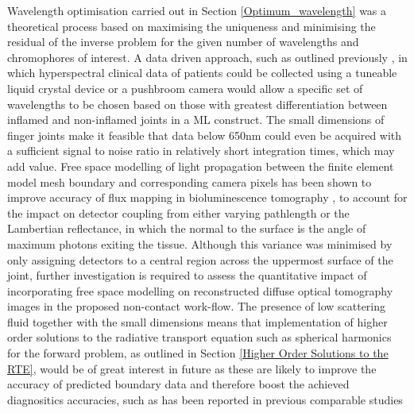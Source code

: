 \documentclass[twoside]{bhamthesis}
\theoremstyle{definition}
\begin{document}
Wavelength optimisation carried out in Section \ref{Optimum_wavelength} was a theoretical process based on maximising the uniqueness and minimising the residual of the inverse problem for the given number of wavelengths and chromophores of interest. A data driven approach, such as outlined previously \cite{dempsey2015data}, in which hyperspectral clinical data of patients could be collected using a tuneable liquid crystal device \cite{woltman2007liquid} or a pushbroom camera \cite{li2013review} would allow a specific set of wavelengths to be chosen based on those with greatest differentiation between inflamed and non-inflamed joints in a ML construct. The small dimensions of finger joints make it feasible that data below 650nm could even be acquired with a sufficient signal to noise ratio in relatively short integration times, which may add value. Free space modelling of light propagation between the finite element model mesh boundary and corresponding camera pixels has been shown to improve accuracy of flux mapping in bioluminescence tomography \cite{guggenheim2014multi}, to account for the impact on detector coupling from either varying pathlength or the Lambertian reflectance, in which the normal to the surface is the angle of maximum photons exiting the tissue. Although this variance was minimised by only assigning detectors to a central region across the uppermost surface of the joint, further investigation is required to assess the quantitative impact of incorporating free space modelling on reconstructed diffuse optical tomography images in the proposed non-contact work-flow. The presence of low scattering fluid together with the small dimensions means that implementation of higher order solutions to the radiative transport equation such as spherical harmonics for the forward problem, as outlined in Section \ref{Higher Order Solutions to the RTE}, would be of great interest in future as these are likely to improve the accuracy of predicted boundary data and therefore boost the achieved diagnositics accuracies, such as has been reported in previous comparable studies \cite{montejo2014computational,yuan2009comparison}
\end{document}

